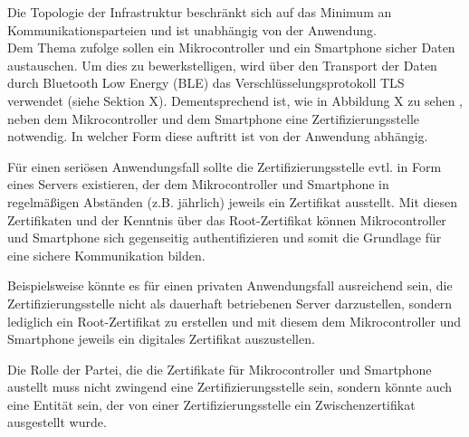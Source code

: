 Die Topologie der Infrastruktur beschränkt sich auf das Minimum an Kommunikationsparteien und ist unabhängig von der Anwendung.\\


Dem Thema zufolge sollen ein Mikrocontroller und ein Smartphone sicher Daten austauschen. Um dies zu bewerkstelligen, wird über den Transport der Daten durch Bluetooth Low Energy (BLE) das Verschlüsselungsprotokoll TLS verwendet (siehe Sektion X). 
Dementsprechend ist, wie in Abbildung X zu sehen
, neben dem Mikrocontroller und dem Smartphone eine Zertifizierungsstelle notwendig. In welcher Form diese auftritt ist von der Anwendung abhängig.

Für einen seriösen Anwendungsfall sollte die Zertifizierungsstelle evtl. in Form eines Servers existieren, der dem Mikrocontroller und Smartphone in regelmäßigen Abständen (z.B. jährlich) jeweils ein Zertifikat ausstellt. Mit diesen Zertifikaten und der Kenntnis über das Root-Zertifikat können Mikrocontroller und Smartphone sich gegenseitig authentifizieren und somit die Grundlage für eine sichere Kommunikation bilden.

Beispielsweise könnte es für einen privaten Anwendungsfall ausreichend sein, die Zertifizierungsstelle nicht als dauerhaft betriebenen Server darzustellen, sondern lediglich ein Root-Zertifikat zu erstellen und mit diesem dem Mikrocontroller und Smartphone jeweils ein digitales Zertifikat auszustellen.

Die Rolle der Partei, die die Zertifikate für Mikrocontroller und Smartphone austellt muss nicht zwingend eine Zertifizierungsstelle sein, sondern könnte auch eine Entität sein, der von einer Zertifizierungsstelle ein Zwischenzertifikat ausgestellt wurde.